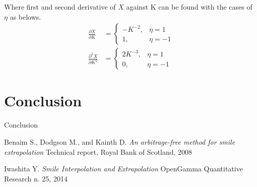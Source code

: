 \documentclass{article}
\begin{document}
Where first and second derivative of $ X $ against K can be found with the cases of $ \eta $ as belows.
\begin{subequations}
    \begin{align}
        \frac{\partial X}{\partial K} &= 
        \begin{cases}
            -K^{-2}, &\eta = 1 \\
            1, &\eta = -1
        \end{cases}\\
        \frac{\partial^2 X}{\partial K^2} &= 
        \begin{cases}
            2 K^{-3}, &\eta = 1 \\
            0, &\eta = -1
        \end{cases}
    \end{align}
\end{subequations}


\section{Conclusion}

Conclusion


\begin{thebibliography}{9}
    Benaim S., Dodgson M., and Kainth D.
    \textit{An arbitrage-free method for smile extrapolation}
    Technical report, Royal Bank of Scotland, 2008
    
    Iwashita Y.
    \textit{Smile Interpolation and Extrapolation}
    OpenGamma Quantitative Research n. 25, 2014
\end{thebibliography}
\end{document}
